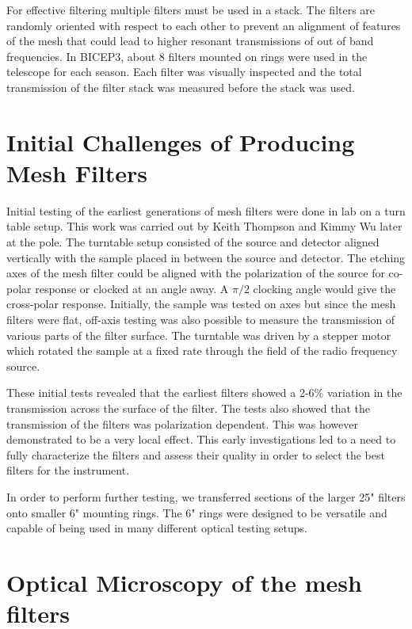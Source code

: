 \documentclass[12pt]{article}
\begin{document}
For effective filtering multiple filters must be used in a stack. The filters are randomly oriented with respect to each other to prevent an alignment of features of the mesh that could lead to higher resonant transmissions of out of band frequencies. In BICEP3, about 8 filters mounted on rings were used in the telescope for each season. Each filter was visually inspected and the total transmission of the filter stack was measured before the stack was used.  

\section{Initial Challenges of Producing Mesh Filters}
Initial testing of the earliest generations of mesh filters were done in lab on a turn table setup. This work was carried out by Keith Thompson and Kimmy Wu later at the pole. The turntable setup consisted of the source and detector aligned vertically with the sample placed in between the source and detector. The etching axes of the mesh filter could be aligned with the polarization of the source for co-polar response or clocked at an angle away. A $\pi/2$ clocking angle would give the cross-polar response. Initially, the sample was tested on axes but since the mesh filters were flat, off-axis testing was also possible to measure the transmission of various parts of the filter surface. The turntable was driven by a stepper motor which rotated the sample at a fixed rate through the field of the radio frequency source.

These initial tests revealed that the earliest filters showed a 2-6\% variation in the transmission across the surface of the filter. The tests also showed that the transmission of the filters was polarization dependent. This was however demonstrated to be a very local effect. This early investigations led to a need to fully characterize the filters and assess their quality in order to select the best filters for the instrument. 

In order to perform further testing, we transferred sections of the larger 25" filters onto smaller 6" mounting rings. The 6" rings were designed to be versatile and capable of being used in many different optical testing setups. 


\section{Optical Microscopy of the mesh filters}
\end{document}
